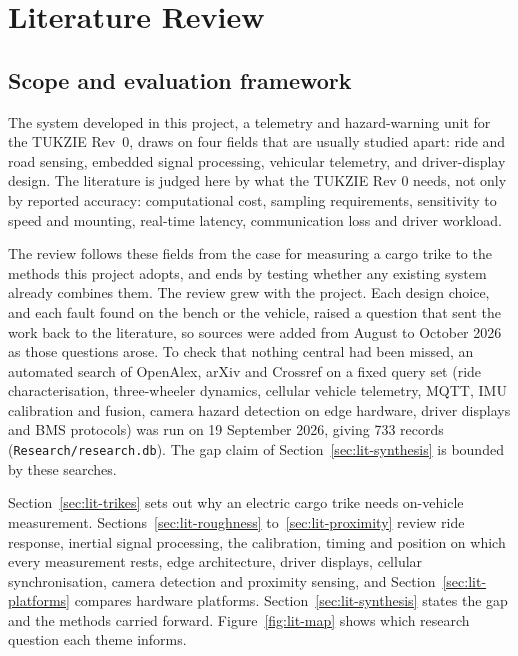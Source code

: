\chapter{Literature Review}
\label{chap:lit}

\section{Scope and evaluation framework}
\label{sec:lit-scope}

The system developed in this project, a telemetry and hazard-warning unit for the TUKZIE Rev~0, draws on four fields that are usually studied apart: ride and road sensing, embedded signal processing, vehicular telemetry, and driver-display design. The literature is judged here by what the TUKZIE Rev 0 needs, not only by reported accuracy: computational cost, sampling requirements, sensitivity to speed and mounting, real-time latency, communication loss and driver workload.

The review follows these fields from the case for measuring a cargo trike to the methods this project adopts, and ends by testing whether any existing system already combines them. The review grew with the project. Each design choice, and each fault found on the bench or the vehicle, raised a question that sent the work back to the literature, so sources were added from August to October 2026 as those questions arose. To check that nothing central had been missed, an automated search of OpenAlex, arXiv and Crossref on a fixed query set (ride characterisation, three-wheeler dynamics, cellular vehicle telemetry, MQTT, IMU calibration and fusion, camera hazard detection on edge hardware, driver displays and BMS protocols) was run on 19 September 2026, giving 733 records (\texttt{Research/research.db}). The gap claim of Section~\ref{sec:lit-synthesis} is bounded by these searches.

Section~\ref{sec:lit-trikes} sets out why an electric cargo trike needs on-vehicle measurement. Sections~\ref{sec:lit-roughness} to~\ref{sec:lit-proximity} review ride response, inertial signal processing, the calibration, timing and position on which every measurement rests, edge architecture, driver displays, cellular synchronisation, camera detection and proximity sensing, and Section~\ref{sec:lit-platforms} compares hardware platforms. Section~\ref{sec:lit-synthesis} states the gap and the methods carried forward. Figure~\ref{fig:lit-map} shows which research question each theme informs.

